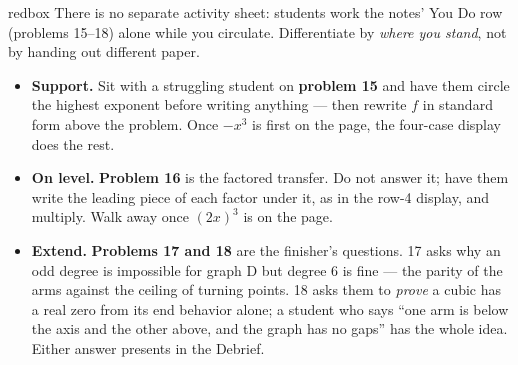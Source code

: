 \documentclass[10pt]{article}
\begin{document}
\begin{skillbox}{redbox}
There is no separate activity sheet: students work the notes' You Do row (problems 15--18)
alone while you circulate. Differentiate by \textit{where you stand}, not by handing out
different paper.

\begin{itemize}
  \item \textbf{Support.} Sit with a struggling student on \textbf{problem 15} and have them
        circle the highest exponent before writing anything --- then rewrite $f$ in standard
        form above the problem. Once $-x^3$ is first on the page, the four-case display does
        the rest.
  \item \textbf{On level.} \textbf{Problem 16} is the factored transfer. Do not answer it;
        have them write the leading piece of each factor under it, as in the row-4 display,
        and multiply. Walk away once $(2x)^3$ is on the page.
  \item \textbf{Extend.} \textbf{Problems 17 and 18} are the finisher's questions. 17 asks
        why an odd degree is impossible for graph D but degree 6 is fine --- the parity of the
        arms against the ceiling of turning points. 18 asks them to \emph{prove} a cubic has a
        real zero from its end behavior alone; a student who says ``one arm is below the
        axis and the other above, and the graph has no gaps'' has the whole idea. Either
        answer presents in the Debrief.
\end{itemize}
\end{skillbox}
\end{document}
